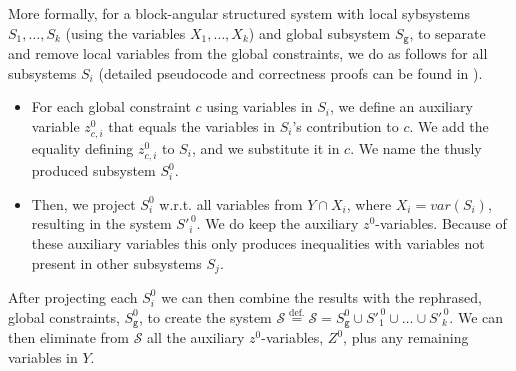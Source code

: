 \documentclass{llncs}
\newcommand{\trt}[1]{\texttt{#1}}
\newcommand{\mi}{\mathit}
\begin{document}
More formally, for a block-angular structured system with local sybsystems $S_1,\ldots, S_k$ (using the variables $X_1,\ldots, X_k$) and global subsystem $S_\texttt{g}$, to separate and remove local variables from the global constraints, we do as follows for all subsystems $S_i$ (detailed pseudocode and correctness proofs can be found in \cite{mytechrep}). 
\begin{itemize}\itemsep0em
\item For each global constraint $c$ using variables in $S_i$, we define an auxiliary variable $z^0_{c,i}$ that equals the variables in $S_i$'s contribution to $c$. We add the equality defining $z^0_{c,i}$ to $S_i$, and we substitute it in $c$. 
We name the thusly produced subsystem $S_i^0$. 
\item Then, we project $S_i^0$ w.r.t. all variables from $Y\cap X_i$, where $X_i=\mi{var}(S_i)$, resulting in the system $S'^{\,0}_i$. We do keep the auxiliary $z^0$-variables. 
Because of these auxiliary variables this only produces inequalities with variables not present in other subsystems $S_j$. 
\end{itemize}
After projecting each $S_i^0$ we can then combine the results with the rephrased, global constraints, $S_\trt{g}^0$, to create the system $\mathcal{S} \overset{\text{def.}}{=}
\mathcal{S} = S^0_\trt{g} \cup S'^{\,0}_1\cup \ldots \cup S'^{\,0}_k$.
We can then eliminate from $\mathcal{S}$ all the auxiliary $z^0$-variables, $Z^0$, plus any remaining variables in $Y$. 
\end{document}
